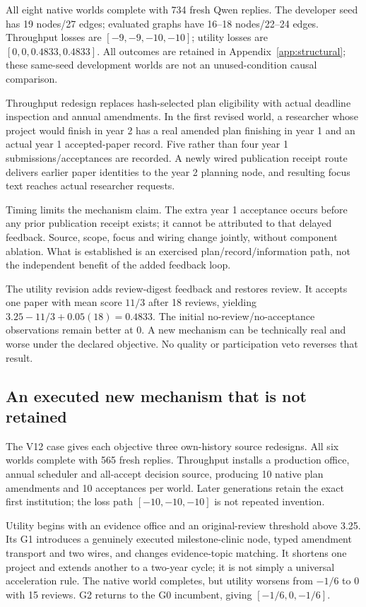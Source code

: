 All eight native worlds complete with 734 fresh Qwen replies. The developer
seed has 19 nodes/27 edges; evaluated graphs have 16--18 nodes/22--24 edges.
Throughput losses are $[-9,-9,-10,-10]$; utility losses are
$[0, 0, 0.4833, 0.4833]$. All outcomes are retained in
Appendix~\ref{app:structural}; these same-seed development worlds are not
an unused-condition causal comparison.

Throughput redesign replaces hash-selected plan eligibility with actual
deadline inspection and annual amendments. In the first revised world,
a researcher whose project would finish in year 2 has a real amended plan
finishing in year 1 and an actual year 1 accepted-paper record. Five rather
than four year 1 submissions/acceptances are recorded. A newly wired publication
receipt route delivers earlier paper identities to the year 2 planning node,
and resulting focus text reaches actual researcher requests.

Timing limits the mechanism claim. The extra year 1 acceptance occurs before
any prior publication receipt exists; it cannot be attributed to that delayed
feedback. Source, scope, focus and wiring change jointly, without component
ablation. What is established is an exercised plan/record/information path,
not the independent benefit of the added feedback loop.

The utility revision adds review-digest feedback and restores review. It accepts
one paper with mean score $11/3$ after 18 reviews, yielding
$3.25-11/3+0.05(18)=0.4833$. The initial no-review/no-acceptance observations
remain better at 0. A new mechanism can be technically real and worse under the
declared objective. No quality or participation veto reverses that result.

\subsection{An executed new mechanism that is not retained}
The V12 case gives each objective three own-history source redesigns. All six
worlds complete with 565 fresh replies. Throughput installs a production office,
annual scheduler and all-accept decision source, producing 10 native plan
amendments and 10 acceptances per world. Later generations retain the exact
first institution; the loss path $[-10,-10,-10]$ is not repeated invention.

Utility begins with an evidence office and an original-review threshold above
3.25. Its G1 introduces a genuinely executed milestone-clinic node, typed
amendment transport and two wires, and changes evidence-topic matching. It
shortens one project and extends another to a two-year cycle; it is not simply
a universal acceleration rule. The native world completes, but utility worsens
from $-1/6$ to 0 with 15 reviews. G2 returns to the G0 incumbent, giving
$[-1/6, 0,-1/6]$.

